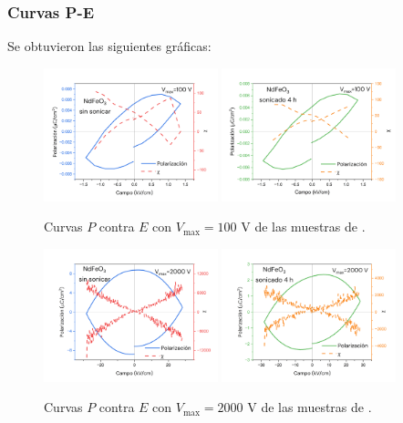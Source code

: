\documentclass[../main.tex]{subfiles}
\begin{document}
\subsubsection{Curvas P-E}
Se obtuvieron las siguientes gráficas:
\begin{figure}[H]
    \centering
    \includegraphics[width=0.45\textwidth]{fig/PENdFeO3100V.png}
    \quad
    \includegraphics[width=0.45\textwidth]{fig/PENdFeO3-S100V.png}
    \caption{Curvas $P$ contra $E$ con $V_\text{max}=100$ V de las muestras de \neod{}.}
    \label{fig:nd100v}
\end{figure}
\begin{figure}[H]
    \centering
    \includegraphics[width=0.45\textwidth]{fig/PENdFeO32000V.png}
    \quad
    \includegraphics[width=0.45\textwidth]{fig/PENdFeO3-S2000V.png}
    \caption{Curvas $P$ contra $E$ con $V_\text{max}=2000$ V de las muestras de \neod{}.}
    \label{fig:nd2000v}
\end{figure}
\end{document}

